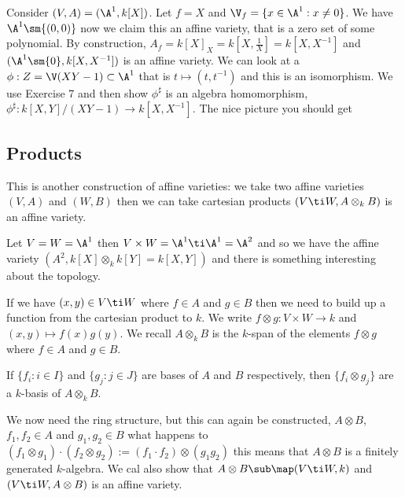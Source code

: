 \begin{eg}
  Consider $(V, A) = (\A^1, k[X])$. Let $f = X$ and $\V_f = \{x \in \A^1 : x \ne 0\}$. We have $\A^1 \sm \{(0, 0)\}$ now we claim this an affine variety, that is a zero set of some polynomial. By construction, $A_f = k[X]_X = k[X, \frac{1}{X}] = k[X, X^{-1}]$ and $(\A^1 \sm \{0\}, k[X, X^{-1}])$ is an affine variety. We can look at a $\phi : Z = \V(XY - 1) \subset \A^1$ that is $t \mapsto (t, t^{-1})$ and this is an isomorphism. We use Exercise 7 and then show $\phi^\sharp$ is an algebra homomorphism, $\phi^\sharp : k[X, Y] / (XY - 1) \to k[X, X^{-1}]$. The nice picture you should get
\end{eg}

\subsection{Products}
This is another construction of affine varieties: we take two affine varieties $(V, A)$ and $(W, B)$ then we can take cartesian products $(V \ti W, A \otimes_k B)$ is an affine variety.

\begin{eg}
  Let $V = W = \A^1$ then $V \times W = \A^1 \ti \A^1 = \A^2$ and so we have the affine variety $(A^2, k[X] \otimes_k k[Y] = k[X, Y])$ and there is something interesting about the topology.
\end{eg}

If we have $(x, y) \in V \ti W$ where $f \in A$ and $g \in B$ then we need to build up a function from the cartesian product to $k$. We write $f \otimes g : V \times W \to k$ and $(x, y) \mapsto f(x)g(y)$. We recall $A \otimes_k B$ is the $k$-span of the elements $f \otimes g$ where $f \in A$ and $g \in B$.

\begin{remark}
   If $\{f_i : i \in I\}$ and $\{g_j : j \in J\}$ are bases of $A$ and $B$ respectively, then $\{f_i \otimes g_j\}$ are a $k$-basis of $A\otimes_k B$.
\end{remark}

We now need the ring structure, but this can again be constructed, $A \otimes B$, $f_1, f_2 \in A$ and $g_1, g_2 \in B$ what happens to $(f_1 \otimes g_1) \cdot (f_2 \otimes g_2) := (f_1 \cdot f_2) \otimes (g_1g_2)$ this means that $A \otimes B$ is a finitely generated $k$-algebra. We cal also show that $A \otimes B \sub \map(V \ti W, k)$ and $(V \ti W, A \otimes B)$ is an affine variety.